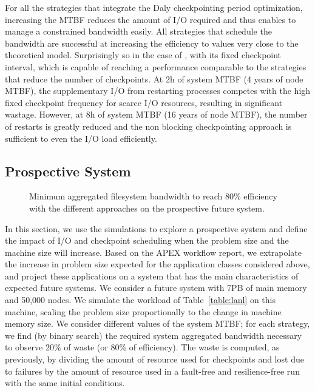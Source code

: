 For all the strategies that integrate the Daly checkpointing period
optimization, increasing the MTBF reduces the amount of I/O required
and thus enables to manage a constrained bandwidth easily. All
strategies that schedule the bandwidth are successful at increasing the
efficiency to values very close to the theoretical model.
%
Surprisingly so in the case of \fifofixed, with its fixed checkpoint
interval, which is capable of reaching a performance
comparable to the strategies that reduce the number of
checkpoints. At 2h of system MTBF (4 years of node MTBF), the
supplementary I/O from restarting processes competes with the high
fixed checkpoint frequency for scarce I/O resources, resulting in
significant wastage. However, at 8h of system MTBF (16 years of node
MTBF), the number of restarts is greatly reduced and the non blocking
checkpointing approach is sufficient to even the I/O load efficiently.

\subsection{Prospective System}

\begin{figure}
  \begin{center}
    \resizebox{\linewidth}{!}{}
  \end{center}
  \caption{Minimum aggregated filesystem bandwidth to reach 80\%
    efficiency with the different approaches on the prospective
    future system.\label{fig:prosp}}
\end{figure}

In this section, we use the simulations to explore a prospective
system and define the impact of I/O and checkpoint scheduling when the
problem size and the machine size will increase. Based on the APEX
workflow report, we extrapolate the increase in problem size expected
for the application classes considered above, and project these
applications on a system that has the main characteristics of expected
future systems. We consider a future system with 7PB of main memory
and 50,000 nodes. We simulate the workload of Table~\ref{table:lanl}
on this machine, scaling the problem size proportionally to the
change in machine memory size. We consider different values of the
system MTBF; for each strategy, we find (by binary search) the
required system aggregated bandwidth necessary to observe 20\% of
waste (or 80\% of efficiency). The waste is computed, as previously,
by dividing the amount of resource used for checkpoints and lost due
to failures by the amount of resource used in a fault-free and
resilience-free run with the same initial conditions.

